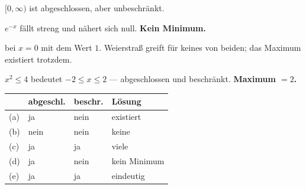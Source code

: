 \begin{aufgabe}
$[0,\infty)$ ist abgeschlossen, aber unbeschränkt.

$e^{-x}$ fällt streng und nähert sich null. \textbf{Kein Minimum.}

 bei $x=0$ mit dem Wert $1$. Weierstraß greift für keines von beiden; das Maximum existiert trotzdem.

$x^2 \le 4$ bedeutet $-2 \le x \le 2$ --- abgeschlossen und beschränkt. \textbf{Maximum $=2$.}

\begin{center}
{\small
\renewcommand{\arraystretch}{1.46}
\begin{tabular}{@{}P{1.0cm}P{1.8cm}P{1.8cm}P{2.6cm}@{}}
\toprule
& \textbf{abgeschl.} & \textbf{beschr.} & \textbf{Lösung}\\
\midrule
(a) & ja & \textcolor{akzent}{nein} & \textcolor{gruen}{existiert}\\
(b) & \textcolor{akzent}{nein} & \textcolor{akzent}{nein} & \textcolor{akzent}{keine}\\
(c) & ja & ja & \textcolor{gruen}{viele}\\
(d) & ja & \textcolor{akzent}{nein} & \textcolor{akzent}{kein Minimum}\\
(e) & ja & ja & \textcolor{gruen}{eindeutig}\\
\bottomrule
\end{tabular}}
\end{center}

\begin{center}
\begin{minipage}{0.88\textwidth}
\end{minipage}
\end{center}
\end{aufgabe}

